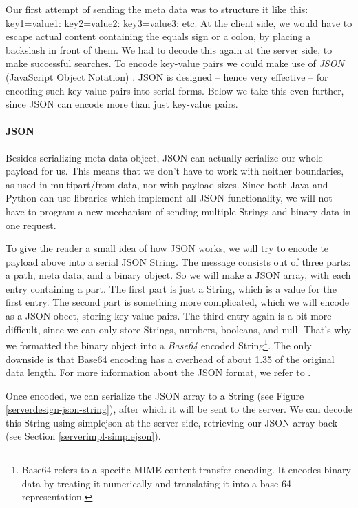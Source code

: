 Our first attempt of sending the meta data was to structure it like this:
key1=value1: key2=value2: key3=value3: etc. At the client side, we would have to
escape actual content containing the equals sign or a colon, by placing a
backslash in front of them. We had to decode this again at the server side, to
make successful searches. To encode key-value pairs we could make use of
\emph{JSON} (JavaScript Object Notation) \cite{json-www}. JSON is designed --
hence very effective -- for encoding such key-value pairs into serial forms.
Below we take this even further, since JSON can encode more than just
key-value pairs.

\paragraph{JSON}
\label{serverdesign-json}
Besides serializing meta data object, JSON can actually serialize our whole
payload for us. This means that we don't have to work with neither boundaries,
as used in multipart/from-data, nor with payload sizes. Since both Java and
Python can use libraries which implement all JSON functionality, we will not
have to program a new mechanism of sending multiple Strings and binary data
in one request. 

To give the reader a small idea of how JSON works, we will try to encode te
payload above into a serial JSON String. The message consists out of three parts:
a path, meta data, and a binary object. So we will make a JSON array, with each
entry containing a part. The first part is just a String, which is a value for
the first entry. The second part is something more complicated, which we will
encode as a JSON obect, storing key-value pairs. The third entry again is a bit
more difficult, since we can only store Strings, numbers, booleans, and null.
That's why we formatted the binary object into a \emph{Base64} encoded
String\footnote{Base64 refers to a specific MIME content transfer encoding. It
encodes binary data by treating it numerically and translating it into a base 64
representation.}. The only downside is that Base64 encoding has a overhead of
about 1.35 of the original data length. For more information about the JSON
format, we refer to \cite{json-www}.

Once encoded, we can serialize the JSON array to a String (see Figure
\ref{serverdesign-json-string}), after which it will be sent to the server. We
can decode this String using simplejson at the server side, retrieving our JSON
array back (see Section \ref{serverimpl-simplejson}).

